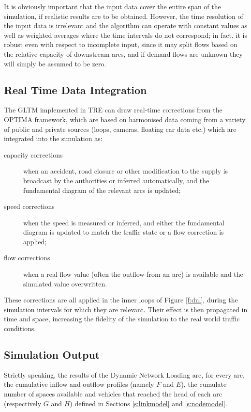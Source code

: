 It is obviously important that the input data cover the entire span of the simulation, if realistic results are to be obtained.
However, the time resolution of the input data is irrelevant and the algorithm can operate with constant values as well as weighted averages where the time intervals do not correspond; in fact, it is robust even with respect to incomplete input, since it may split flows based on the relative capacity of downstream arcs, and if demand flows are unknown they will simply be assumed to be zero.


\subsection{Real Time Data Integration}
The GLTM implemented in TRE can draw real-time corrections from the OPTIMA framework, which are based on harmonised data coming from a variety of public and private sources (loops, cameras, floating car data etc.) which are integrated into the simulation as:
\begin{description}
\item[capacity corrections] when an accident, road closure or other modification to the supply is broadcast by the authorities or inferred automatically, and the fundamental diagram of the relevant arcs is updated;
\item[speed corrections] when the speed is measured or inferred, and either the fundamental diagram is updated to match the traffic state or a flow correction is applied;
\item[flow corrections] when a real flow value (often the outflow from an arc) is available and the simulated value overwritten.
\end{description}

These corrections are all applied in the inner loops of Figure \ref{f:dnl}, during the simulation intervals for which they are relevant. Their effect is then propagated in time and space, increasing the fidelity of the simulation to the real world traffic conditions.


\subsection{Simulation Output} \label{s:output}
Strictly speaking, the results of the Dynamic Network Loading are, for every arc, the cumulative inflow and outflow profiles (namely $F$ and $E$), the cumulate number of spaces available and vehicles that reached the head of each arc (respectively $G$ and $H$) defined in Sections \ref{s:linkmodel} and \ref{s:nodemodel}.

